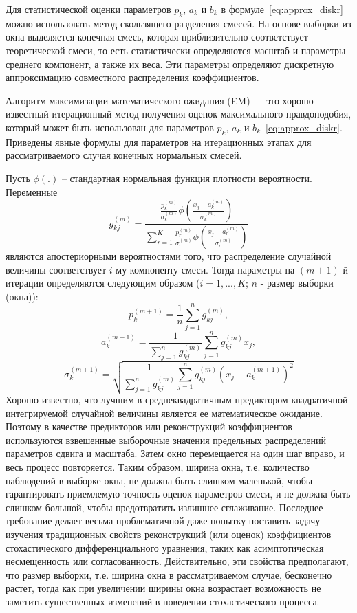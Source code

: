 Для статистической оценки параметров $p_k$, $a_k$ и $b_k$ в формуле~\eqref{eq:approx_diskr} можно использовать метод скользящего разделения смесей. На основе выборки из окна выделяется конечная смесь, которая приблизительно соответствует теоретической смеси, то есть статистически определяются масштаб и параметры среднего компонент, а также их веса. Эти параметры определяют дискретную аппроксимацию совместного распределения коэффициентов.

Алгоритм максимизации математического ожидания (EM)~\cite{McLachlan2007} -- это хорошо известный итерационный метод получения оценок максимального правдоподобия, который может быть использован для параметров $p_k$, $a_k$ и $b_k$~\eqref{eq:approx_diskr}. Приведены явные формулы для параметров на итерационных этапах для рассматриваемого случая конечных нормальных смесей. 

Пусть $\phi(.)$ -- стандартная нормальная функция плотности вероятности. Переменные 
$$
g_{kj}^{(m)}= \frac{\frac{p_k^{(m)}}{\sigma_k^{(m)}} \phi\left(\frac{x_j - a_k^{(m)}}{\sigma_k^{(m)}} \right)}{\sum\limits_{r=1}^K \frac{p_r^{(m)}}{\sigma_r^{(m)}} \phi\left(\frac{x_j - a_r^{(m)}}{\sigma_r^{(m)}} \right)}
$$
являются апостериорными вероятностями того, что распределение случайной величины соответствует $i$-му компоненту смеси. Тогда параметры на $(m+1)$-й итерации определяются следующим образом ($i=1,...,K$; $n$ - размер выборки (окна)):
$$
p_k^{(m+1)} = \frac{1}{n} \sum\limits_{j=1}^n g_{kj}^{(m)},
$$
$$
a_k^{(m+1)} = \frac{1}{\sum\limits_{j=1}^n g_{kj}^{(m)}} \sum\limits_{j=1}^n g_{kj}^{(m)} x_j,
$$
$$
\sigma_k^{(m+1)} = \sqrt{\frac{1}{\sum\limits_{j=1}^n g_{kj}^{(m)}} \sum\limits_{j=1}^n g_{kj}^{(m)} (x_j - a_k^{(m+1)})^2}
$$
Хорошо известно, что лучшим в среднеквадратичным предиктором квадратичной интегрируемой случайной величины является ее математическое ожидание. Поэтому в качестве предикторов или реконструкций коэффициентов используются взвешенные выборочные значения предельных распределений параметров сдвига и масштаба. Затем окно перемещается на один шаг вправо, и весь процесс повторяется. Таким образом, ширина окна, т.е. количество наблюдений в выборке окна, не должна быть слишком маленькой, чтобы гарантировать приемлемую точность оценок параметров смеси, и не должна быть слишком большой, чтобы предотвратить излишнее сглаживание. Последнее требование делает весьма проблематичной даже попытку поставить задачу изучения традиционных свойств реконструкций (или оценок) коэффициентов стохастического дифференциального уравнения, таких как асимптотическая несмещенность или согласованность. Действительно, эти свойства предполагают, что размер выборки, т.е. ширина окна в рассматриваемом случае, бесконечно растет, тогда как при увеличении ширины окна возрастает возможность не заметить существенных изменений в поведении стохастического процесса.

